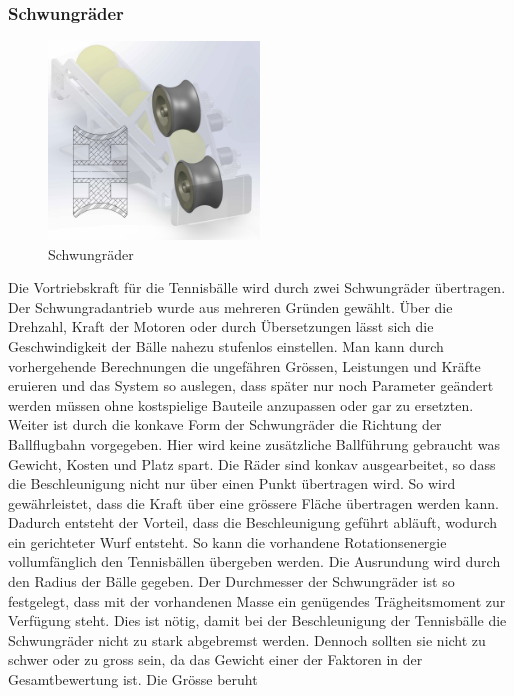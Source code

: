 \subsubsection{Schwungräder}
\begin{figure}
	\centering
	\includegraphics[width=0.5\textwidth]{Enddokumentation/Loesungskonzept/Bilder/Schwungraeder.jpg}
	\caption{Schwungräder}
	\label{fig:Schwungräder}	
\end{figure}
Die Vortriebskraft für die Tennisbälle wird durch zwei Schwungräder übertragen. Der
Schwungradantrieb wurde aus mehreren Gründen gewählt. Über die Drehzahl, Kraft der Motoren oder
durch Übersetzungen lässt sich die Geschwindigkeit der Bälle nahezu stufenlos einstellen. Man kann
durch vorhergehende Berechnungen die ungefähren Grössen, Leistungen und Kräfte eruieren und das
System so auslegen, dass später nur noch Parameter geändert werden müssen ohne kostspielige Bauteile
anzupassen oder gar zu ersetzten. Weiter ist durch die konkave Form der Schwungräder die Richtung der 
Ballflugbahn vorgegeben. Hier wird keine zusätzliche Ballführung gebraucht was Gewicht, Kosten und
Platz spart. Die Räder sind konkav ausgearbeitet, so dass die Beschleunigung nicht nur über einen
Punkt übertragen wird. So wird gewährleistet, dass die Kraft über eine grössere Fläche
übertragen werden kann. Dadurch entsteht der Vorteil, dass die Beschleunigung geführt
abläuft, wodurch ein gerichteter Wurf entsteht. So kann die vorhandene Rotationsenergie vollumfänglich 
den Tennisbällen übergeben werden. Die Ausrundung wird durch den Radius der Bälle
gegeben. Der Durchmesser der Schwungräder ist so festgelegt, dass mit der vorhandenen Masse ein
genügendes Trägheitsmoment zur Verfügung steht. Dies ist nötig, damit bei der Beschleunigung der
Tennisbälle die Schwungräder nicht zu stark abgebremst werden. Dennoch sollten sie nicht zu schwer
oder zu gross sein, da das Gewicht einer der Faktoren in der Gesamtbewertung ist. Die Grösse beruht
